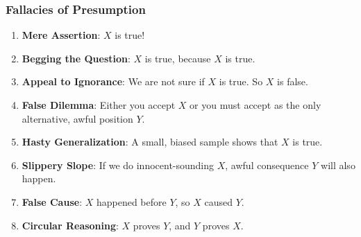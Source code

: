 \documentclass[]{article}
\newcommand{\notsowide}{\setlength{\parskip}{5mm}}
\begin{document}
\subsubsection*{Fallacies of Presumption}

\begin{enumerate} \notsowide

\item \textbf{Mere Assertion}: $X$ is true!

\item \textbf{Begging the Question}: $X$ is true, because $X$ is true.

\item \textbf{Appeal to Ignorance}: We are not sure if $X$ is true. So $X$ is false.

\item \textbf{False Dilemma}: Either you accept $X$ or you must accept as the only alternative, awful position $Y$.

\item \textbf{Hasty Generalization}: A small, biased sample shows that $X$ is true.

\item \textbf{Slippery Slope}: If we do innocent-sounding $X$, awful consequence $Y$ will also happen.

\item \textbf{False Cause}: $X$ happened before $Y$, so $X$ caused $Y$.

\item \textbf{Circular Reasoning}: $X$ proves $Y$, and $Y$ proves $X$.
\end{enumerate}
\end{document}
